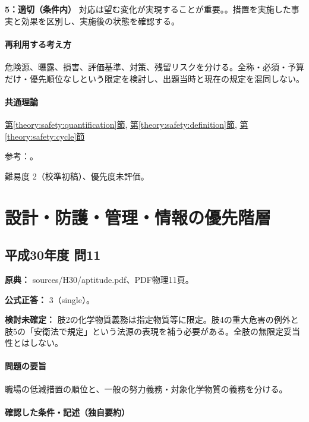 \noindent\textbf{5：適切（条件内）} 対応は望む変化が実現することが重要。。措置を実施した事実と効果を区別し、実施後の状態を確認する。\par

\paragraph{再利用する考え方} 危険源、曝露、損害、評価基準、対策、残留リスクを分ける。全称・必須・予算だけ・優先順位なしという限定を検討し、出題当時と現在の規定を混同しない。

\paragraph{共通理論} \hyperref[theory:safety:quantification]{第\ref*{theory:safety:quantification}節}, \hyperref[theory:safety:definition]{第\ref*{theory:safety:definition}節}, \hyperref[theory:safety:cycle]{第\ref*{theory:safety:cycle}節}

\par 参考：\cite{saf_ra2006,saf_iso31000}。

\par 難易度 2（校準初稿）、優先度未評価。

\section{設計・防護・管理・情報の優先階層}

\subsection{平成30年度 問11}
\label{q:h30-reg-apt-11}

\noindent\textbf{原典：} sources/H30/aptitude.pdf、PDF物理11頁。

\textbf{公式正答：} 3（single）。

\par\textbf{検討未確定：} 肢2の化学物質義務は指定物質等に限定。肢4の重大危害の例外と肢5の「安衛法で規定」という法源の表現を補う必要がある。全肢の無限定妥当性とはしない。

\paragraph{問題の要旨} 職場の低減措置の順位と、一般の努力義務・対象化学物質の義務を分ける。

\paragraph{確認した条件・記述（独自要約）}\mbox{}\par

